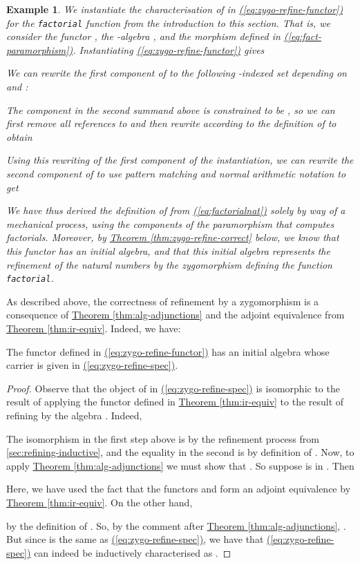 \documentclass{LMCS}
\newtheorem{eorollary}{Example}
\newcommand{\parenref}[1]{\hyperref[#1]{(\ref*{#1})}}
\newcommand{\thmref}[1]{\hyperref[#1]{Theorem \ref*{#1}}}
\begin{document}
\begin{eorollary}\label{ex:factorial-refine}
  We instantiate the characterisation of 
  in \parenref{eq:zygo-refine-functor} for the \texttt{factorial}
  function from the introduction to this section. That is, we consider
  the functor , the -algebra
  , and the morphism  defined
  in \parenref{eq:fact-paramorphism}.  Instantiating
  \parenref{eq:zygo-refine-functor} gives
  
  We can rewrite the first component of
   to the following
  -indexed set depending on  and :
  
  The  component in the second summand above is constrained to be
  , so we can first remove all references to  and then
  rewrite according to the definition of  to obtain
  
  Using this rewriting of the first component of the instantiation, we
  can rewrite the second component of
   to
  use pattern matching and normal arithmetic notation to get
  
  We have thus derived the definition of 
  from \parenref{eq:factorialnat} solely by way of a mechanical
  process, using the components of the paramorphism that computes
  factorials. Moreover, by \thmref{thm:zygo-refine-correct} below, we
  know that this functor has an initial algebra, and that this initial
  algebra represents the refinement of the natural numbers by the
  zygomorphism defining the function \verb|factorial|.
\end{eorollary}

As described above, the correctness of refinement by a zygomorphism is
a consequence of \thmref{thm:alg-adjunctions} and the adjoint
equivalence from \thmref{thm:ir-equiv}. Indeed, we have:

\begin{thm}\label{thm:zygo-refine-correct}
  The functor  defined
  in \parenref{eq:zygo-refine-functor} has an initial algebra whose
  carrier is given in \parenref{eq:zygo-refine-spec}.
\end{thm}

\begin{proof}
  Observe that the object of 
  in \parenref{eq:zygo-refine-spec} is isomorphic to the result of
  applying the functor  defined in \thmref{thm:ir-equiv} to the
  result of refining  by the algebra
  . Indeed,
  
  The isomorphism in the first step above is by the refinement process
  from \autoref{sec:refining-inductive}, and the equality in the
  second is by definition of . Now, to apply
  \thmref{thm:alg-adjunctions} we must show that . So
  suppose  is in . Then
  
 Here, we have used the fact that the functors  and  form
 an adjoint equivalence by \thmref{thm:ir-equiv}. On the other hand,
  
  by the definition of . So, by the comment
  after \thmref{thm:alg-adjunctions}, . But
  since  is the same
  as \parenref{eq:zygo-refine-spec}, we have
  that \parenref{eq:zygo-refine-spec} can indeed be inductively
  characterised as .
\end{proof}
\end{document}
